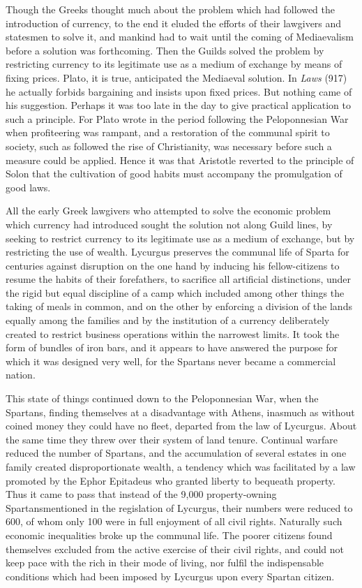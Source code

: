 \documentclass{book}
\begin{document}
Though the Greeks thought much about the problem which had followed the introduction of currency, to the end it eluded the efforts of their lawgivers and statesmen to solve it, and mankind had to wait until the coming of Mediaevalism before a solution was forthcoming. Then the Guilds solved the problem by restricting currency to its legitimate use as a medium of exchange by means of fixing prices. Plato, it is true, anticipated the Mediaeval solution. In \emph{Laws} (917) he actually forbids bargaining and insists upon fixed prices. But nothing came of his suggestion. Perhaps it was too late in the day to give practical application to such a principle. For Plato wrote in the period following the Peloponnesian War when profiteering was rampant, and a restoration of the communal spirit to society, such as followed the rise of Christianity, was necessary before such a measure could be applied. Hence it was that Aristotle reverted to the principle of Solon that the cultivation of good habits must accompany the promulgation of good laws.

All the early Greek lawgivers who attempted to solve the economic problem which currency had introduced sought the solution not along Guild lines, by seeking to restrict currency to its legitimate use as a medium of exchange, but by restricting the use of wealth. Lycurgus preserves the communal life of Sparta for centuries against disruption on the one hand by inducing his fellow-citizens to resume the habits of their forefathers, to sacrifice all artificial distinctions, under the rigid but equal discipline of a camp which included among other things the taking of meals in common, and on the other by enforcing a division of the lands equally among the families and by the institution of a currency deliberately created to restrict business operations within the narrowest limits. It took the form of bundles of iron bars, and it appears to have answered the purpose for which it was designed very well, for the Spartans never became a commercial nation.

This state of things continued down to the Peloponnesian War, when the Spartans, finding themselves at a disadvantage with Athens, inasmuch as without coined money they could have no fleet, departed from the law of Lycurgus. About the same time they threw over their system of land tenure. Continual warfare reduced the number of Spartans, and the accumulation of several estates in one family created disproportionate wealth, a tendency which was facilitated by a law promoted by the Ephor Epitadeus who granted liberty to bequeath property. Thus it came to pass that instead of the 9,000 property-owning Spartansmentioned in the regislation of Lycurgus, their numbers were reduced to 600, of whom only 100 were in full enjoyment of all civil rights. Naturally such economic inequalities broke up the communal life. The poorer citizens found themselves excluded from the active exercise of their civil rights, and could not keep pace with the rich in their mode of living, nor fulfil the indispensable conditions which had been imposed by Lycurgus upon every Spartan citizen.
\end{document}
